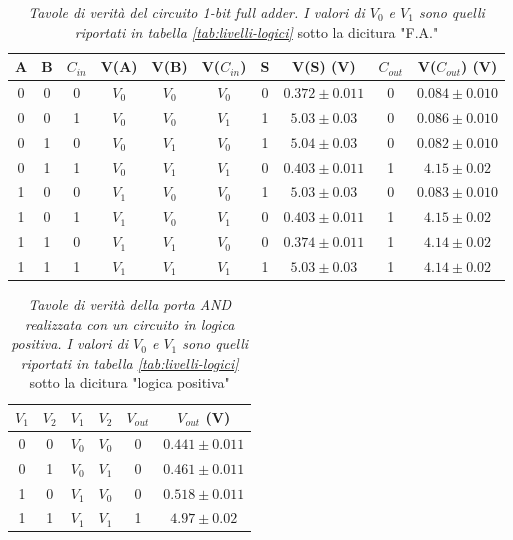 \begin{table}[H]
  \centering
  \begin{tabular}[t]{c  c  c | c  c  c | c  c | c  c}
    \hline
    A & B & $C_{in}$ & V(A) & V(B) & V($C_{in}$) & S & V(S) (V) & $C_{out}$ & V($C_{out}$) (V) \\
    \hline
    0 & 0 & 0 & $V_{0}$ & $V_{0}$ & $V_{0}$ & 0 & $0.372 \pm 0.011$   & 0 & $0.084 \pm 0.010 $\\
    0 & 0 & 1 & $V_{0}$ & $V_{0}$ & $V_{1}$ & 1 & $5.03 \pm 0.03$   & 0 & $0.086 \pm 0.010$\\
    0 & 1 & 0 & $V_{0}$ & $V_{1}$ & $V_{0}$ & 1 & $5.04 \pm 0.03$   & 0 & $0.082 \pm 0.010$\\
    0 & 1 & 1 & $V_{0}$ & $V_{1}$ & $V_{1}$ & 0 & $0.403 \pm 0.011$ & 1 & $4.15 \pm 0.02$\\
    1 & 0 & 0 & $V_{1}$ & $V_{0}$ & $V_{0}$ & 1 & $5.03 \pm 0.03$   & 0 & $0.083 \pm 0.010$\\
    1 & 0 & 1 & $V_{1}$ & $V_{0}$ & $V_{1}$ & 0 & $0.403 \pm 0.011$ & 1 & $4.15 \pm 0.02$\\
    1 & 1 & 0 & $V_{1}$ & $V_{1}$ & $V_{0}$ & 0 & $0.374 \pm 0.011$ & 1 & $4.14 \pm 0.02$\\
    1 & 1 & 1 & $V_{1}$ & $V_{1}$ & $V_{1}$ & 1 & $5.03 \pm 0.03$   & 1 & $4.14 \pm 0.02$\\
    \hline
  \end{tabular}
  \caption{\emph{Tavole di verità del circuito \emph{1-bit full adder}. I valori di $V_{0}$ e $V_{1}$ sono quelli riportati in tabella \ref{tab:livelli-logici}} sotto la dicitura "F.A."}
  \label{tab:fulladder}
\end{table}

\begin{table}[H]
  \centering
  \begin{tabular}[t]{c  c | c  c | c  c}
    \hline
    $V_{1}$ & $V_{2}$ & $V_{1}$ & $V_{2}$ & $V_{out}$ & $V_{out}$ (V) \\
    \hline
    0 & 0 & $V_{0}$ & $V_{0}$ & 0 & $0.441 \pm 0.011$ \\
    0 & 1 & $V_{0}$ & $V_{1}$ & 0 & $0.461 \pm 0.011$ \\
    1 & 0 & $V_{1}$ & $V_{0}$ & 0 & $0.518 \pm 0.011$ \\
    1 & 1 & $V_{1}$ & $V_{1}$ & 1 & $4.97 \pm 0.02$ \\
    \hline
  \end{tabular}
  \caption{\emph{Tavole di verità della porta \emph{AND} realizzata con un circuito in logica positiva. I valori di $V_{0}$ e $V_{1}$ sono quelli riportati in tabella \ref{tab:livelli-logici}} sotto la dicitura "logica positiva"}
  \label{tab:and-logicapositiva}
\end{table}

